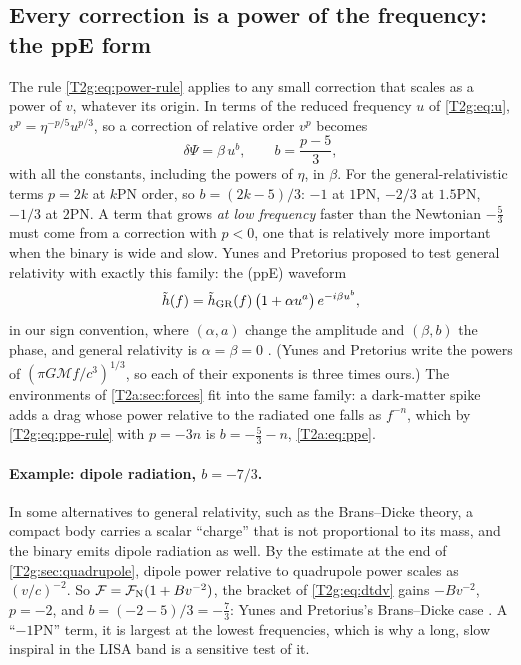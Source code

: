 \subsection{Every correction is a power of the frequency: the ppE form}

The rule \eqref{T2g:eq:power-rule} applies to any small correction that scales as a power of $v$, whatever its origin. In terms of the reduced frequency $u$ of \eqref{T2g:eq:u}, $v^p=\eta^{-p/5}u^{p/3}$, so a correction of relative order $v^p$ becomes
\begin{equation}
  \delta\Psi=\beta\,u^{b},\qquad b=\frac{p-5}{3},
  \label{T2g:eq:ppe-rule}
\end{equation}
with all the constants, including the powers of $\eta$, in $\beta$. For the general-relativistic terms $p=2k$ at $k$PN order, so $b=(2k-5)/3$: $-1$ at $1$PN, $-2/3$ at $1.5$PN, $-1/3$ at $2$PN. A term that grows \emph{at low frequency} faster than the Newtonian $-\tfrac53$ must come from a correction with $p<0$, one that is relatively more important when the binary is wide and slow. Yunes and Pretorius proposed to test general relativity with exactly this family: the  (ppE) waveform
\begin{equation}
  \tilde h(f)=\tilde h_{\rm GR}(f)\,\big(1+\alpha u^{a}\big)\,e^{-i\beta u^{b}},
  \label{T2g:eq:ppe}
\end{equation}
in our sign convention, where $(\alpha,a)$ change the amplitude and $(\beta,b)$ the phase, and general relativity is $\alpha=\beta=0$ \cite[eq.~(1)]{YunesPretorius2009}. (Yunes and Pretorius write the powers of $(\pi G\mathcal Mf/c^3)^{1/3}$, so each of their exponents is three times ours.) The environments of \cref{T2a:sec:forces} fit into the same family: a dark-matter spike adds a drag whose power relative to the radiated one falls as $f^{-n}$, which by \eqref{T2g:eq:ppe-rule} with $p=-3n$ is $b=-\tfrac53-n$, \eqref{T2a:eq:ppe}.

\paragraph{Example: dipole radiation, $b=-7/3$.}
In some alternatives to general relativity, such as the Brans--Dicke theory, a compact body carries a scalar ``charge'' that is not proportional to its mass, and the binary emits dipole radiation as well. By the estimate at the end of \cref{T2g:sec:quadrupole}, dipole power relative to quadrupole power scales as $(v/c)^{-2}$. So $\mathcal F=\mathcal F_{\rm N}(1+Bv^{-2})$, the bracket of \eqref{T2g:eq:dtdv} gains $-Bv^{-2}$, $p=-2$, and $b=(-2-5)/3=-\tfrac73$: Yunes and Pretorius's Brans--Dicke case \cite{YunesPretorius2009}. A ``$-1$PN'' term, it is largest at the lowest frequencies, which is why a long, slow inspiral in the LISA band is a sensitive test of it.

